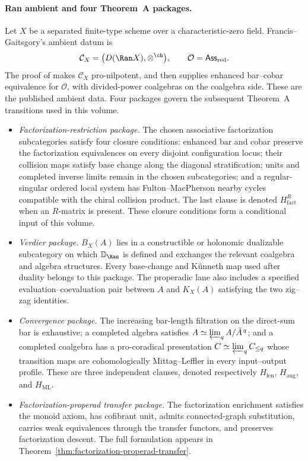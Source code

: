 \paragraph{Ran ambient and four Theorem~A packages.}
Let $X$ be a separated finite-type scheme over a characteristic-zero
field.  Francis--Gaitsgory's ambient datum is
\[
 \mathcal C_X=\bigl(D(\Ran X),\otimes^{\ch}\bigr),
 \qquad \mathcal O=\mathsf{Ass}_{\mathrm{red}}.
\]
The proof of \cite[Theorem~5.1.1]{Francis2012} makes
$\mathcal C_X$ pro-nilpotent, and
\cite[Proposition~4.1.2]{Francis2012} then supplies enhanced
bar--cobar equivalence for $\mathcal O$, with divided-power
coalgebras on the coalgebra side.  These are the published ambient
data.  Four packages govern the subsequent Theorem~A transitions used in this
volume.
\begin{itemize}
\item[$H_{\mathrm{fact}}$] \emph{Factorization-restriction package.}
The chosen associative factorization subcategories satisfy four
closure conditions: enhanced bar and cobar preserve the
factorization equivalences on every disjoint configuration locus;
their collision maps satisfy base change along the diagonal
stratification; units and completed inverse limits remain in the
chosen subcategories; and a regular-singular ordered local system has
Fulton--MacPherson nearby cycles compatible with the chiral collision
product.  The last clause is denoted $H_{\mathrm{fact}}^{R}$ when an
$R$-matrix is present.  These closure conditions form a conditional
input of this volume.
\item[$H_{\mathrm{VD}}$] \emph{Verdier package.}
$B_X(A)$ lies in a constructible or holonomic dualizable subcategory
on which $\mathbb D_{\Ran}$ is defined and exchanges the relevant
coalgebra and algebra structures.  Every base-change and K\"unneth
map used after duality belongs to this package.  The properadic lane
also includes a specified evaluation--coevaluation pair between $A$
and $K_X(A)$ satisfying the two zig--zag identities.
\item[$H_{\mathrm{conv}}$] \emph{Convergence package.}
The increasing bar-length filtration on the direct-sum bar is
exhaustive; a completed algebra satisfies
$A\simeq\varprojlim_q A/\bar A^{\,q}$; and a completed coalgebra has a
pro-coradical presentation
$C\simeq\varprojlim_q C_{\leq q}$ whose transition maps are
cohomologically Mittag--Leffler in every input--output profile.
These are three independent clauses, denoted respectively
$H_{\mathrm{len}}$, $H_{\mathrm{aug}}$, and $H_{\mathrm{ML}}$.
\item[$H_{\mathrm{prop}}$] \emph{Factorization-properad transfer
package.}
The factorization enrichment satisfies the monoid axiom, has
cofibrant unit, admits connected-graph substitution, carries weak
equivalences through the transfer functors, and preserves
factorization descent.  The full formulation appears in
Theorem~\ref{thm:factorization-properad-transfer}.
\end{itemize}
